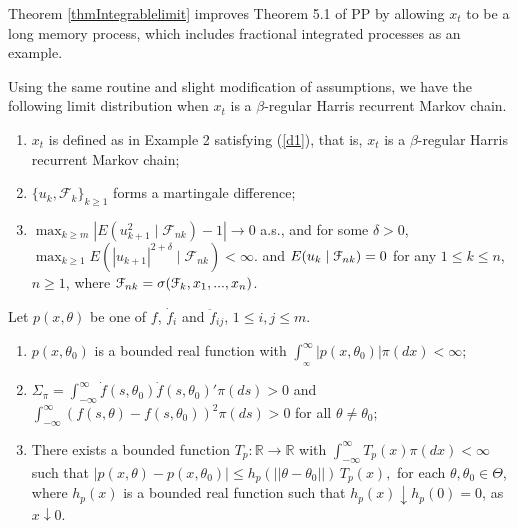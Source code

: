 \begin{rem}
Theorem \ref{thmIntegrablelimit} improves Theorem 5.1 of PP by allowing $x_t$ to be a long memory process, which includes fractional integrated processes as an example.
\end{rem}

Using the same routine and slight modification of assumptions, we have the following limit distribution when $x_t$ is a $\beta$-regular Harris recurrent Markov chain.


\newenvironment{assump_ad1} {\trivlist \item[\hskip\labelsep\textbf{Assumption \ref{ad1}*.}]}{\endtrivlist}
\newenvironment{assump_ad2} {\trivlist \item[\hskip\labelsep\textbf{Assumption \ref{ad2}*.}]}{\endtrivlist}

\begin{assump_ad1}
\begin{enumerate}[label=(\roman{*}), leftmargin=*, widest=0] \itemsep0pt \parskip0pt 
\item $x_t$ is defined as in Example 2 satisfying (\ref{d1}), that is, $x_t$ is a $\beta$-regular Harris recurrent Markov chain;
\item $\{u_k, \mathcal F_k\}_{k\ge 1}$ forms a martingale difference;
\item $\max_{k\ge m}|E(u_{k+1}^2\mid \mathcal F_{nk})-1|\to 0$  a.s., and for some $\delta>0$, $ \max_{k\ge 1 } E(|u_{k+1}|^{2+\delta}\mid \mathcal F_{nk})<\infty. $ and $E(u_k\mid \mathcal F_{nk})=0$ for any $1\le k\le n$, $n \ge 1$, where $\mathcal F_{nk} = \sigma( \mathcal F_k, x_1, ..., x_n)$.
\end{enumerate}
\end{assump_ad1}

\begin{assump_ad2} Let $p(x, \theta)$ be one of $f$, $\dot{f}_i$ and $\ddot{f}_{ij}$, $1\le i,j\le m$.
\begin{enumerate}[label=(\roman{*}), leftmargin=*, widest=0] \itemsep0pt \parskip0pt 
\item $p(x, \theta_0)$ is a bounded real function with $\int_{_\infty}^{\infty}|p(x, \theta_0)|\pi(dx)<\infty$;
\item $\Sigma_\pi = \int_{-\infty}^{\infty} \dot{f}(s, \theta_0) \dot{f}(s, \theta_0)' \pi(ds)>0$ and $ \int_{-\infty}^{\infty} (f(s, \theta) - f(s, \theta_0))^2 \pi(ds)>0 $ for all $\theta\not=\theta_0$;
\item There exists a bounded function $T_p:\mathbb{R} \rightarrow \mathbb{R}$ with $\int_{-\infty}^{\infty} T_p(x) \pi(dx) < \infty$ such that
$
|p(x, \theta) - p(x, \theta_0)| \le h_p(||\theta - \theta_0||) \,T_p(x),
 $
for each $\theta,\theta_0 \in \Theta$, where $h_p(x)$ is a bounded real function such that $h_p(x)\downarrow h_p(0)=0$, as $x\downarrow 0.$
\end{enumerate}
\end{assump_ad2}

